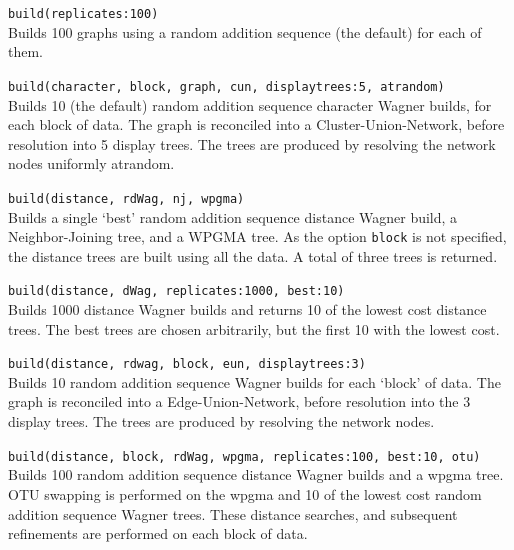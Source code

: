 	\begin{example}
		\item{\texttt{build(replicates:100)} \\
		Builds 100 graphs using a random addition sequence (the default) for each of them.}
		
		\item{\texttt{build(character, block, graph, cun, displaytrees:5, atrandom)}\\
		Builds 10 (the default) random addition sequence character Wagner builds, for each 
		block of data. The graph is reconciled into a Cluster-Union-Network, before resolution 
		into 5 display trees. The trees are produced by resolving the network nodes 
		uniformly atrandom.}
		
		\item{\texttt{build(distance, rdWag, nj, wpgma)} \\ 
		Builds a single `best' random addition sequence distance Wagner build, a Neighbor-Joining 
		tree, and a WPGMA tree. As the option \texttt{block} is not specified, the distance trees 
		are built using all the data. A total of three trees is returned. }
		
		\item{\texttt{build(distance, dWag, replicates:1000, best:10)}\\
		Builds 1000 distance Wagner builds and returns 10 of the lowest cost distance trees.
		The best trees are chosen arbitrarily, but the first 10 with the lowest cost.}
	
		\item{\texttt{build(distance, rdwag, block, eun, displaytrees:3)}\\
		Builds 10 random addition sequence Wagner builds for each `block' of data. The graph 
		is reconciled into a Edge-Union-Network, before resolution into the 3 display trees. 
		The trees are produced by resolving the network nodes.}
		
		\item{\texttt{build(distance, block, rdWag, wpgma, replicates:100, best:10, otu)}\\
		Builds 100 random addition sequence distance Wagner builds and a wpgma tree. 
		OTU swapping is performed on the wpgma and 10 of the lowest cost random addition 
		sequence Wagner trees. These distance searches, and subsequent refinements are 
		performed on each block of data.}
	\end{example}

